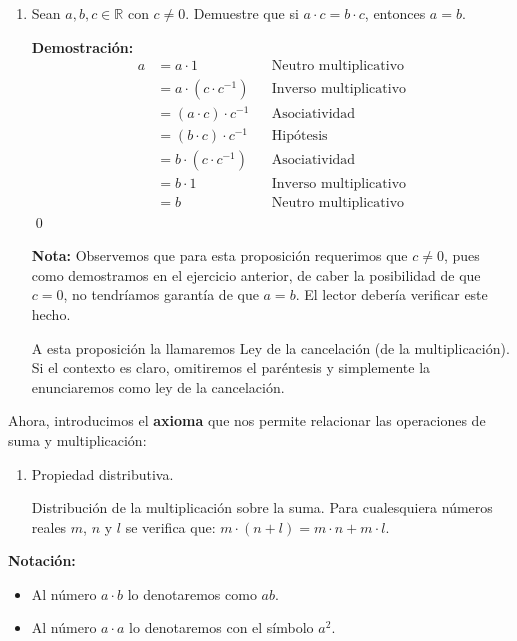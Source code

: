 \documentclass[11pt]{article}
\newcommand{\R}{\mathbb{R}}
\begin{document}
\begin{enumerate}[label=\alph*)]
        \item Sean $a,b,c\in \R$ con $c\neq 0$. Demuestre que si $a\cdot c=b\cdot c$, entonces $a=b$.
            
        \textbf{Demostración:} \begin{align*}
        a &= a\cdot 1 && \text{Neutro multiplicativo}\\
        &= a \cdot (c\cdot c^{-1}) && \text{Inverso multiplicativo}\\
        &= (a \cdot c) \cdot c^{-1} && \text{Asociatividad}\\
        &= (b \cdot c) \cdot c^{-1} && \text{Hipótesis}\\
        &= b \cdot (c\cdot c^{-1}) && \text{Asociatividad}\\
        &= b \cdot 1 && \text{Inverso multiplicativo}\\
        &= b && \text{Neutro multiplicativo}
        \end{align*} \qed
    
        \textbf{Nota:} Observemos que para esta proposición requerimos que $c\neq 0$, pues como demostramos en el ejercicio anterior, de caber la posibilidad de que $c=0$, no tendríamos garantía de que $a=b$. El lector debería verificar este hecho.%

        A esta proposición la llamaremos Ley de la cancelación (de la multiplicación). Si el contexto es claro, omitiremos el paréntesis y simplemente la enunciaremos como ley de la cancelación.

    \end{enumerate}

    Ahora, introducimos el \textbf{axioma} que nos permite relacionar las operaciones de suma y multiplicación:

\begin{enumerate}[label=P.D.]
    \item Propiedad distributiva.
    
    Distribución de la multiplicación sobre la suma. Para cualesquiera números reales $m$, $n$ y $l$ se verifica que: $ m \cdot (n+l)=m \cdot n+m \cdot l $.
\end{enumerate}

\textbf{Notación:} \begin{itemize}
    \item Al número $a\cdot b$ lo denotaremos como $ab$.
    \item Al número $a\cdot a$ lo denotaremos con el símbolo $a^2$.
\end{itemize}
\end{document}
